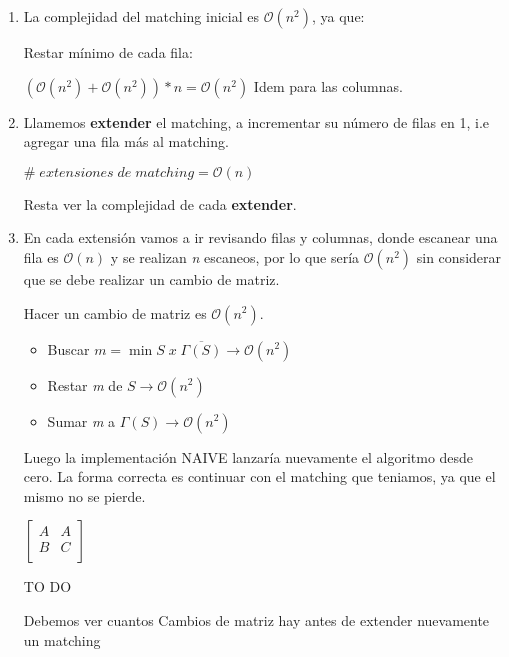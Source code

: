\documentclass[12pt,a4paper]{report}
\begin{document}
			\begin{enumerate}
				\item La complejidad del matching inicial es $\mathcal{O}(n^{2})$, ya que:
				
					Restar mínimo de cada fila:
					\begin{center}
						$(\mathcal{O}(n^{2}) + \mathcal{O}(n^{2})) * n = \mathcal{O}(n^{2})$
						Idem para las columnas.
					\end{center}
				
				\item Llamemos \textbf{extender} el matching, a incrementar su número de filas en 1, i.e agregar una fila más al matching.
				\begin{center}
					$ \# \; extensiones \; de \; matching = \mathcal{O}(n)$
				\end{center}
				
				Resta ver la complejidad de cada \textbf{extender}.
				
				\item En cada extensión vamos a ir revisando filas y columnas, donde escanear una fila es $\mathcal{O}(n)$ y se realizan \textit{n} escaneos, por lo que sería $\mathcal{O}(n^{2})$ sin considerar que se debe realizar un cambio de matriz.
				
				Hacer un cambio de matriz es $\mathcal{O}(n^{2})$.				
				\begin{itemize}
					\item Buscar $\textit{m} = \min S \; x \; \overline{\Gamma(S)} \rightarrow \mathcal{O}(n^{2})$
					\item Restar \textit{m} de $S \rightarrow \mathcal{O}(n^{2})$
					\item Sumar \textit{m} a $\Gamma(S) \rightarrow \mathcal{O}(n^{2})$
				\end{itemize}
				
				Luego la implementación NAIVE lanzaría nuevamente el algoritmo desde cero. La forma correcta es continuar con el matching que teniamos, ya que el mismo no se pierde.
				\begin{center}
				$
				\begin{bmatrix}
				A & A \\
				B  & C \\
				\end{bmatrix}					
				$
				\end{center}
				
				TO DO
				
				Debemos ver cuantos Cambios de matriz hay antes de extender nuevamente un matching
				

\end{enumerate}
\end{document}
